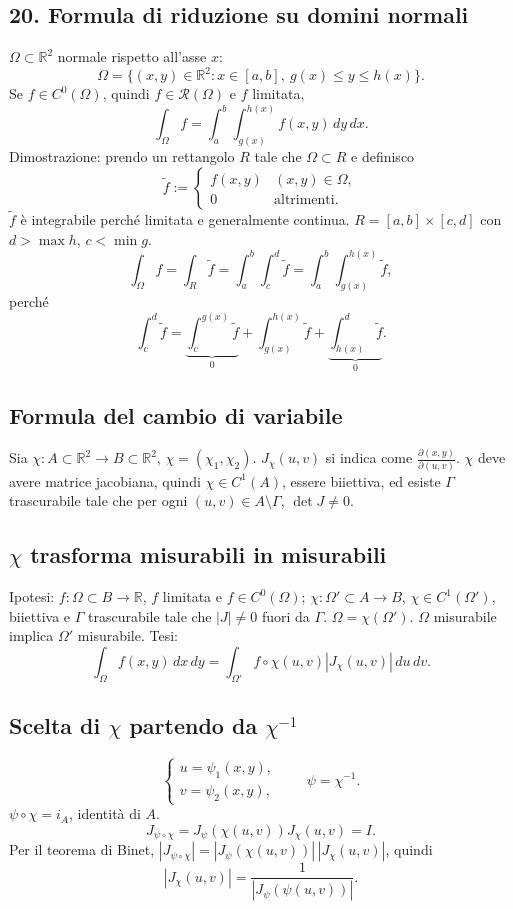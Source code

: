 \documentclass[11pt,a4paper]{article}
\newcommand{\R}{\mathbb R}\newcommand{\N}{\mathbb N}\newcommand{\pagina}[1]{\clearpage}
\begin{document}
\subsection*{20. Formula di riduzione su domini normali}
$\Omega\subset\R^2$ normale rispetto all'asse $x$:
\[\Omega=\{(x,y)\in\R^2:x\in[a,b],\ g(x)\le y\le h(x)\}.\]
Se $f\in C^0(\Omega)$, quindi $f\in\mathcal R(\Omega)$ e $f$ limitata,
\[\int_\Omega f=\int_a^b\int_{g(x)}^{h(x)}f(x,y)\,dy\,dx.\]
Dimostrazione: prendo un rettangolo $R$ tale che $\Omega\subset R$ e definisco
\[\widetilde f:=\begin{cases}f(x,y)&(x,y)\in\Omega,\\0&\text{altrimenti}.\end{cases}\]
$\widetilde f$ è integrabile perché limitata e generalmente continua. $R=[a,b]\times[c,d]$ con $d>\max h$, $c<\min g$.
\[\int_\Omega f=\int_R\widetilde f=\int_a^b\int_c^d\widetilde f=\int_a^b\int_{g(x)}^{h(x)}\widetilde f,\]
perché
\[\int_c^d\widetilde f=\underbrace{\int_c^{g(x)}\widetilde f}_{0}+\int_{g(x)}^{h(x)}\widetilde f+\underbrace{\int_{h(x)}^d\widetilde f}_{0}.\]
\pagina{43}
\subsection*{Formula del cambio di variabile}
Sia $\chi:A\subset\R^2\to B\subset\R^2$, $\chi=(\chi_1,\chi_2)$. $J_\chi(u,v)$ si indica come $\frac{\partial(x,y)}{\partial(u,v)}$. $\chi$ deve avere matrice jacobiana, quindi $\chi\in C^1(A)$, essere biiettiva, ed esiste $\Gamma$ trascurabile tale che per ogni $(u,v)\in A\setminus\Gamma$, $\det J\ne0$.
\subsection*{$\chi$ trasforma misurabili in misurabili}
Ipotesi: $f:\Omega\subset B\to\R$, $f$ limitata e $f\in C^0(\Omega)$; $\chi:\Omega'\subset A\to B$, $\chi\in C^1(\Omega')$, biiettiva e $\Gamma$ trascurabile tale che $|J|\ne0$ fuori da $\Gamma$. $\Omega=\chi(\Omega')$. $\Omega$ misurabile implica $\Omega'$ misurabile.
Tesi:
\[\int_\Omega f(x,y)\,dx\,dy=\int_{\Omega'}f\circ\chi(u,v)|J_\chi(u,v)|\,du\,dv.\]
\subsection*{Scelta di $\chi$ partendo da $\chi^{-1}$}
\[\begin{cases}u=\psi_1(x,y),\\v=\psi_2(x,y),\end{cases}\qquad\psi=\chi^{-1}.\]
$\psi\circ\chi=i_A$, identità di $A$.
\[J_{\psi\circ\chi}=J_\psi(\chi(u,v))J_\chi(u,v)=I.\]
Per il teorema di Binet, $|J_{\psi\circ\chi}|=|J_\psi(\chi(u,v))|\,|J_\chi(u,v)|$, quindi
\[|J_\chi(u,v)|=\frac1{|J_\psi(\psi(u,v))|}.\]
\pagina{44}
\end{document}
